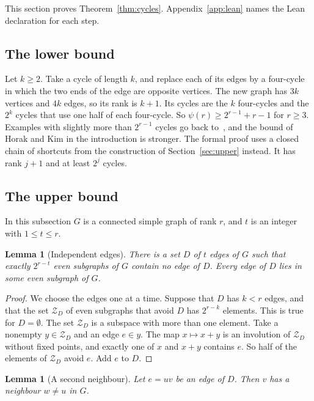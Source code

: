 \documentclass[11pt]{article}
\newtheorem{lemma}[theorem]{Lemma}
\theoremstyle{definition}
\theoremstyle{remark}
\newcommand{\Z}{\mathcal{Z}}
\begin{document}
This section proves Theorem~\ref{thm:cycles}. Appendix~\ref{app:lean} names the Lean declaration for
each step.

\subsection{The lower bound}

Let $k\ge2$. Take a cycle of length $k$, and replace each of its edges by a four-cycle in which the
two ends of the edge are opposite vertices. The new graph has $3k$ vertices and $4k$ edges, so its
rank is $k+1$. Its cycles are the $k$ four-cycles and the $2^{k}$ cycles that use one half of each
four-cycle. So $\psi(r)\ge2^{r-1}+r-1$ for $r\ge3$. Examples with slightly more than $2^{r-1}$
cycles go back to~\cite{ES}, and the bound of Horak and Kim in the introduction is stronger. The
formal proof uses a closed chain of shortcuts from the construction of Section~\ref{sec:upper}
instead. It has rank $j+1$ and at least $2^{j}$ cycles.

\subsection{The upper bound}

In this subsection $G$ is a connected simple graph of rank $r$, and $t$ is an integer with
$1\le t\le r$.

\begin{lemma}[Independent edges]\label{lem:indep}
There is a set $D$ of $t$ edges of $G$ such that exactly $2^{r-t}$ even subgraphs of $G$ contain no
edge of $D$. Every edge of $D$ lies in some even subgraph of $G$.
\end{lemma}

\begin{proof}
We choose the edges one at a time. Suppose that $D$ has $k<r$ edges, and that the set $\Z_D$ of even
subgraphs that avoid $D$ has $2^{r-k}$ elements. This is true for $D=\emptyset$. The set $\Z_D$ is
a subspace with more than one element. Take a nonempty $y\in\Z_D$ and an edge $e\in y$. The map
$x\mapsto x+y$ is an involution of $\Z_D$ without fixed points, and exactly one of $x$ and $x+y$
contains $e$. So half of the elements of $\Z_D$ avoid $e$. Add $e$ to $D$.
\end{proof}

\begin{lemma}[A second neighbour]\label{lem:apex}
Let $e=uv$ be an edge of $D$. Then $v$ has a neighbour $w\ne u$ in $G$.
\end{lemma}
\end{document}
